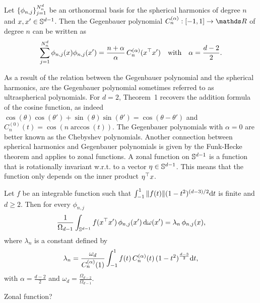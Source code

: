\begin{theorem}[Addition]
    \label{theorem:addition}
    Let $\{\phi_{n,j}\}_{j=1}^{N^d_n}$ be an orthonormal basis for the spherical harmonics of degree $n$ and $x,x' \in \mathbb{S}^{d-1}$. Then the Gegenbauer polynomial $C_n^{(\alpha)}: [-1, 1] \rightarrow \Reals$ of degree $n$ can be written as
\begin{equation}
    \sum_{j=1}^{N^d_n} \phi_{n, j}(x) \phi _{n, j}(x') = \frac{n + \alpha}{\alpha}\,
    C_n^{(\alpha)}(x^{\top} x')\quad\text{with}\quad \alpha = \frac{d-2}{2}.
\end{equation}
\end{theorem}
As a result of the relation between the Gegenbauer polynomial and the spherical harmonics, are the Gegenbauer polynomial sometimes referred to as ultraspherical polynomials. For $d=2$, Theorem~1 recovers the addition formula of the cosine function, as indeed $\cos(\theta) \cos(\theta') + \sin(\theta) \sin(\theta') = \cos(\theta - \theta')$ and $C_n^{(0)}(t) = \cos(n \arccos(t))$. The Gegenbauer polynomials with $\alpha=0$ are better known as the Chebyshev polynomials. Another connection between spherical harmonics and Gegenbauer polynomials is given by the Funk-Hecke theorem and applies to zonal functions. A zonal function on $\mathbb{S}^{d-1}$ is a function that is rotationally invariant w.r.t. to a vector $\eta \in \mathbb{S}^{d-1}$. This means that the function only depends on the inner product $\eta^{\top} x$.

\begin{theorem}
    Let $f$ be an integrable function such that $\int_{-1}^1 \| f(t)\| (1 - t^2)^{(d-3)/2} \mathrm{d}{t}$ is finite and $d \ge 2$. Then for every $\phi_{n,j}$ 
    \begin{equation}
        \frac{1}{\Omega_{d-1}} \int_{\mathbb{S}^{d-1}} f(x^{\top} x')\,\phi_{n, j}(x')\, \mathrm{d}{\omega(x')} = {\lambda}_{n}\,\phi_{n,j}(x),
    \end{equation}
    where ${\lambda}_{n}$ is a constant defined by
    \begin{equation}
        \lambda_{n}  = 
        \frac{\omega_{d}}{C_n^{(\alpha)}(1)} \int_{-1}^1 f(t)\,C_n^{(\alpha)}(t)\,(1 - t^2)^{\frac{d-3}{2}} \mathrm{d}{t},
    \end{equation}
    with $\alpha = \frac{d-2}{2}$ and $\omega_d = \frac{\Omega_{d-2}}{\Omega_{d-1}}$.
\end{theorem}
Zonal function?


